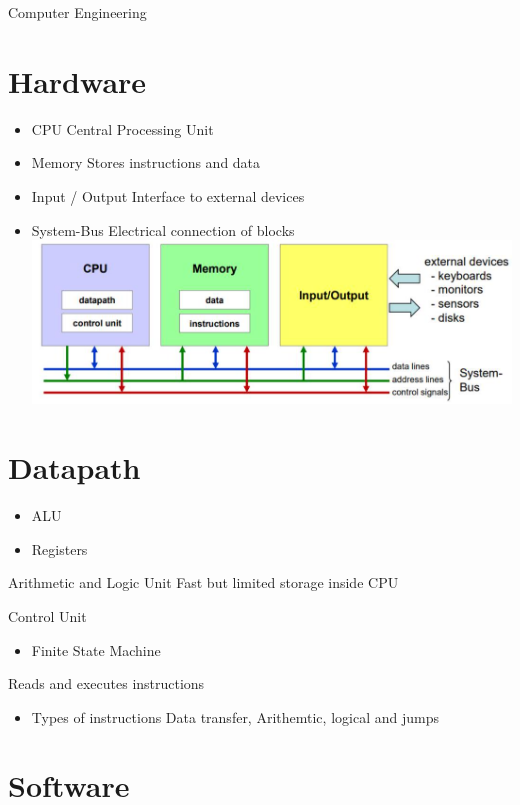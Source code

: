 \documentclass[10pt]{article}
\begin{document}
Computer Engineering

\section*{Hardware}
\begin{itemize}
  \item CPU Central Processing Unit
  \item Memory Stores instructions and data
  \item Input / Output Interface to external devices
  \item System-Bus Electrical connection of blocks\\
\includegraphics[width=\linewidth]{images/2024_12_29_79e6b22f503fb7b4f718g-01(1)}
\end{itemize}

\section*{Datapath}
\begin{itemize}
  \item ALU
  \item Registers
\end{itemize}

Arithmetic and Logic Unit Fast but limited storage inside CPU

Control Unit

\begin{itemize}
  \item Finite State Machine
\end{itemize}

Reads and executes instructions

\begin{itemize}
  \item Types of instructions Data transfer, Arithemtic, logical and jumps
\end{itemize}

\section*{Software}
\end{document}
